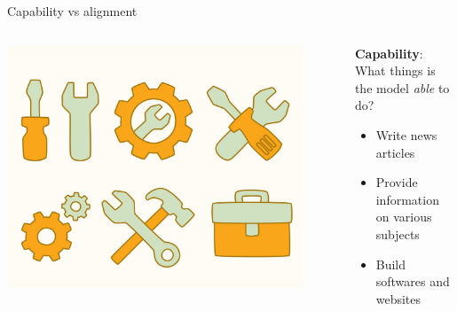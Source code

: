 \documentclass[usenames,dvipsnames,notes,11pt,aspectratio=169,hyperref={colorlinks=true, linkcolor=blue}]{beamer}
\begin{document}
\begin{frame}
    {Capability vs alignment}

        \begin{columns}
        \begin{column}{0.3\textwidth}
        \includegraphics[width=0.9\textwidth]{figures/tools}
        \end{column}
        \begin{column}{0.7\textwidth}
    \textbf{Capability}: What things is the model \emph{able} to do?\\
    \begin{itemize}
        \item Write news articles
        \item Provide information on various subjects
        \item Build softwares and websites
    \end{itemize}
        \end{column}
        \end{columns}


\end{frame}
\end{document}
